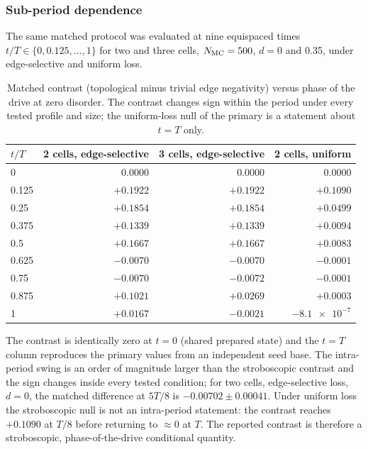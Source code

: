 \documentclass[aps,pra,preprint,superscriptaddress,amsmath,amssymb]{revtex4-2}
\begin{document}
\subsubsection{Sub-period dependence}
\label{sec:micromotion}

The same matched protocol was evaluated at nine equispaced times $t/T\in\{\num{0},\num{0.125},\ldots,\num{1}\}$ for two and three cells, $N_{\rm MC}=\num{500}$, $d=\num{0}$ and \num{0.35}, under edge-selective and uniform loss.

\begin{table}[h]
\caption{Matched contrast (topological minus trivial edge negativity) versus phase of the drive at zero disorder. The contrast changes sign within the period under every tested profile and size; the uniform-loss null of the primary is a statement about $t=T$ only.}
\label{tab:micromotion}
\begin{ruledtabular}
\begin{tabular}{lrrr}
$t/T$ & \num{2} cells, edge-selective & \num{3} cells, edge-selective & \num{2} cells, uniform \\
\hline
\num{0} & \num{0.0000} & \num{0.0000} & \num{0.0000} \\
\num{0.125} & $+\num{0.1922}$ & $+\num{0.1922}$ & $+\num{0.1090}$ \\
\num{0.25} & $+\num{0.1854}$ & $+\num{0.1854}$ & $+\num{0.0499}$ \\
\num{0.375} & $+\num{0.1339}$ & $+\num{0.1339}$ & $+\num{0.0094}$ \\
\num{0.5} & $+\num{0.1667}$ & $+\num{0.1667}$ & $+\num{0.0083}$ \\
\num{0.625} & $-\num{0.0070}$ & $-\num{0.0070}$ & $-\num{0.0001}$ \\
\num{0.75} & $-\num{0.0070}$ & $-\num{0.0072}$ & $-\num{0.0001}$ \\
\num{0.875} & $+\num{0.1021}$ & $+\num{0.0269}$ & $+\num{0.0003}$ \\
\num{1} & $+\num{0.0167}$ & $-\num{0.0021}$ & $-\num{8.1e-7}$ \\
\end{tabular}
\end{ruledtabular}
\end{table}

The contrast is identically zero at $t=\num{0}$ (shared prepared state) and the $t=T$ column reproduces the primary values from an independent seed base. The intra-period swing is an order of magnitude larger than the stroboscopic contrast and the sign changes inside every tested condition; for two cells, edge-selective loss, $d=\num{0}$, the matched difference at $5T/8$ is $-\num{0.00702}\pm\num{0.00041}$. Under uniform loss the stroboscopic null is not an intra-period statement: the contrast reaches $+\num{0.1090}$ at $T/8$ before returning to ${\approx}\num{0}$ at $T$. The reported contrast is therefore a stroboscopic, phase-of-the-drive conditional quantity.
\end{document}
